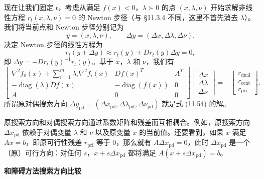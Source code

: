 \documentclass[UTF8,12pt,a4paper,fontset=fandol]{ctexart}
\begin{document}
现在让我们固定 $t$，考虑从满足 $f(x)<0$，$\lambda\succ 0$ 的点 $(x,\lambda,\nu)$ 开始求解非线性方程 $r_t(x,\lambda,\nu)=0$ 的 Newton 步径（与 \S 11.3.4 不同，这里不首先消去 $\lambda$）。我们将当前点和 Newton 步径分别记为
\[
y=(x,\lambda,\nu),\qquad \Delta y=(\Delta x,\Delta\lambda,\Delta\nu).
\]
决定 Newton 步径的线性方程为
\[
r_t(y+\Delta y)\approx r_t(y)+Dr_t(y)\Delta y=0,
\]
即 $\Delta y=-Dr_t(y)^{-1}r_t(y)$。基于 $x$，$\lambda$ 和 $\nu$，我们有
\begin{equation}
\begin{bmatrix}
\nabla^2 f_0(x)+\sum_{i=1}^m\lambda_i\nabla^2f_i(x) & Df(x)^T & A^T\\
-\operatorname{diag}(\lambda)Df(x) & -\operatorname{diag}(f(x)) & 0\\
A & 0 & 0
\end{bmatrix}
\begin{bmatrix}
\Delta x\\
\Delta\lambda\\
\Delta\nu
\end{bmatrix}
=-
\begin{bmatrix}
r_{\mathrm{dual}}\\
r_{\mathrm{cent}}\\
r_{\mathrm{pri}}
\end{bmatrix}.
\tag{11.54}
\end{equation}
所谓原对偶搜索方向 $\Delta y_{\mathrm{pd}}=(\Delta x_{\mathrm{pd}},\Delta\lambda_{\mathrm{pd}},\Delta\nu_{\mathrm{pd}})$ 就是式 (11.54) 的解。

原搜索方向和对偶搜索方向通过系数矩阵和残差而互相耦合。例如，原搜索方向 $\Delta x_{\mathrm{pd}}$ 依赖于对偶变量 $\lambda$ 和 $\nu$ 以及原变量 $x$ 的当前值。还要看到，如果 $x$ 满足 $Ax=b$，即原可行性残差 $r_{\mathrm{pri}}$ 等于 0，那么就有 $A\Delta x_{\mathrm{pd}}=0$，此时 $\Delta x_{\mathrm{pd}}$ 是一个（原）可行方向：对任何 $s$，$x+s\Delta x_{\mathrm{pd}}$ 都将满足 $A(x+s\Delta x_{\mathrm{pd}})=b$。

\noindent\textbf{和障碍方法搜索方向比较}
\end{document}
